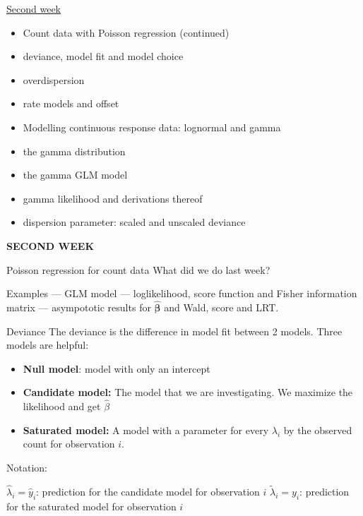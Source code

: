 \documentclass[
  ignorenonframetext,
]{beamer}
\providecommand{\tightlist}{%
  \setlength{\itemsep}{0pt}\setlength{\parskip}{0pt}}
\begin{document}
\begin{frame}
\begin{block}{\protect\hyperlink{secondweek}{Second week}}
\protect\hypertarget{second-week}{}
\begin{itemize}
\item
  Count data with Poisson regression (continued)
\item
  deviance, model fit and model choice
\item
  overdispersion
\item
  rate models and offset
\item
  Modelling continuous response data: lognormal and gamma
\item
  the gamma distribution
\item
  the gamma GLM model
\item
  gamma likelihood and derivations thereof
\item
  dispersion parameter: scaled and unscaled deviance
\end{itemize}
\end{block}
\end{frame}

\begin{frame}
\textbf{ SECOND WEEK}
\end{frame}

\begin{frame}{Poisson regression for count data}
\protect\hypertarget{poisson-regression-for-count-data}{}
What did we do last week?

Examples --- GLM model --- loglikelihood, score function and Fisher
information matrix --- asympototic results for
\(\hat{\boldsymbol{\beta}}\) and Wald, score and LRT.
\end{frame}

\begin{frame}{Deviance}
\protect\hypertarget{deviance}{}
The deviance is the difference in model fit between 2 models. Three
models are helpful:

\begin{itemize}
\tightlist
\item
  \textbf{Null model}: model with only an intercept
\item
  \textbf{Candidate model:} The model that we are investigating. We
  maximize the likelihood and get \(\hat{\beta}\)
\item
  \textbf{Saturated model:} A model with a parameter for every
  \(\lambda_i\) by the observed count for observation \(i\).
\end{itemize}

Notation:

\(\hat{\lambda}_i = \hat{y}_i\): prediction for the candidate model for
observation \(i\) \(\tilde{\lambda}_i=y_i\): prediction for the
saturated model for observation \(i\)
\end{frame}
\end{document}
